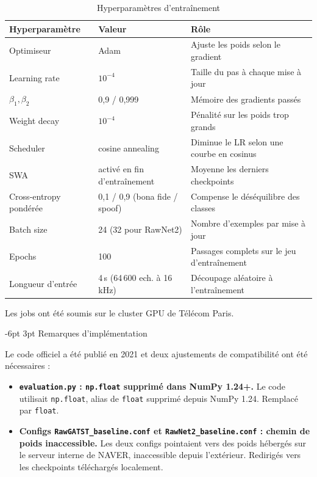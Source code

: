 \documentclass[10pt, a4paper]{article}
\makeatletter
\renewcommand{\subsection}{\@startsection{subsection}{2}{\z@}%
  {-6pt \@plus -2pt \@minus -1pt}{3pt \@plus 1pt}%
  {\normalfont\large\bfseries}}
\makeatother
\begin{document}
\begin{table}[H]
\centering\small
\caption{Hyperparamètres d'entraînement}
\begin{tabular}{@{}lll@{}}
\toprule
Hyperparamètre & Valeur & Rôle \\
\midrule
Optimiseur & Adam & Ajuste les poids selon le gradient \\
Learning rate & $10^{-4}$ & Taille du pas à chaque mise à jour \\
$\beta_1, \beta_2$ & 0,9 / 0,999 & Mémoire des gradients passés \\
Weight decay & $10^{-4}$ & Pénalité sur les poids trop grands \\
Scheduler & cosine annealing & Diminue le LR selon une courbe en cosinus \\
SWA & activé en fin d'entraînement & Moyenne les derniers checkpoints \\
Cross-entropy pondérée & 0,1 / 0,9 (bona fide / spoof) & Compense le déséquilibre des classes \\
Batch size & 24 (32 pour RawNet2) & Nombre d'exemples par mise à jour \\
Epochs & 100 & Passages complets sur le jeu d'entraînement \\
Longueur d'entrée & 4\,s (64\,600 ech. à 16\,kHz) & Découpage aléatoire à l'entraînement \\
\bottomrule
\end{tabular}
\end{table}

Les jobs ont été soumis sur le cluster GPU de Télécom Paris.

\subsection{Remarques d'implémentation}

Le code officiel a été publié en 2021 et deux ajustements de compatibilité ont été nécessaires :

\begin{itemize}
  \item \textbf{\texttt{evaluation.py} : \texttt{np.float} supprimé dans NumPy 1.24+.} Le code utilisait \texttt{np.float}, alias de \texttt{float} supprimé depuis NumPy 1.24. Remplacé par \texttt{float}.
  \item \textbf{Configs \texttt{RawGATST\_baseline.conf} et \texttt{RawNet2\_baseline.conf} : chemin de poids inaccessible.} Les deux configs pointaient vers des poids hébergés sur le serveur interne de NAVER, inaccessible depuis l'extérieur. Redirigés vers les checkpoints téléchargés localement.
\end{itemize}
\end{document}
